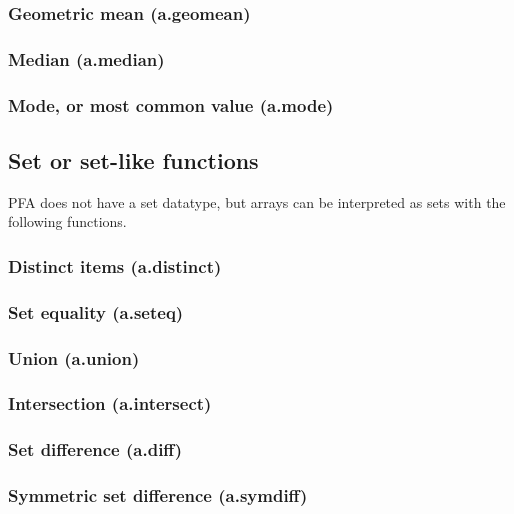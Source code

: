 \documentclass{article}
\theoremstyle{definition}
\begin{document}
\subsubsection{Geometric mean (a.geomean)}

\subsubsection{Median (a.median)}

\subsubsection{Mode, or most common value (a.mode)}

\hypertarget{hsec:set-like}{}
\subsection{Set or set-like functions}
\label{sec:set-like}

PFA does not have a set datatype, but arrays can be interpreted as sets with the following functions.

\subsubsection{Distinct items (a.distinct)}

\subsubsection{Set equality (a.seteq)}

\subsubsection{Union (a.union)}

\subsubsection{Intersection (a.intersect)}

\subsubsection{Set difference (a.diff)}

\subsubsection{Symmetric set difference (a.symdiff)}
\end{document}

